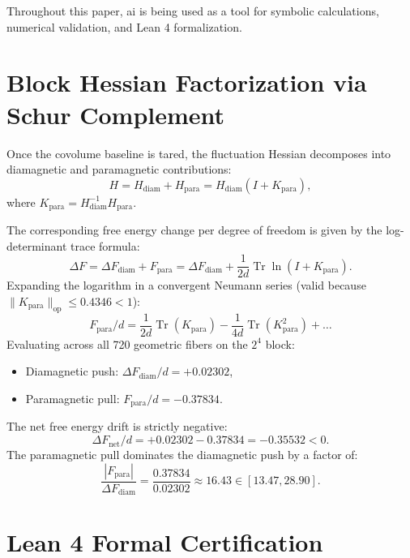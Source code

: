 \documentclass[11pt,a4paper]{article}
\theoremstyle{definition}
\begin{document}
Throughout this paper, ai is being used as a tool for symbolic calculations, numerical validation, and Lean 4 formalization.

\section{Block Hessian Factorization via Schur Complement}

Once the covolume baseline is tared, the fluctuation Hessian decomposes into diamagnetic and paramagnetic contributions:
\begin{equation}
H = H_{\mathrm{diam}} + H_{\mathrm{para}} = H_{\mathrm{diam}} (I + K_{\mathrm{para}}),
\end{equation}
where $K_{\mathrm{para}} = H_{\mathrm{diam}}^{-1} H_{\mathrm{para}}$.

The corresponding free energy change per degree of freedom is given by the log-determinant trace formula:
\begin{equation}
\Delta F = \Delta F_{\mathrm{diam}} + F_{\mathrm{para}} = \Delta F_{\mathrm{diam}} + \frac{1}{2d} \operatorname{Tr} \ln(I + K_{\mathrm{para}}).
\end{equation}
Expanding the logarithm in a convergent Neumann series (valid because $\|K_{\mathrm{para}}\|_{\mathrm{op}} \le 0.4346 < 1$):
\begin{equation}
F_{\mathrm{para}}/d = \frac{1}{2d} \operatorname{Tr}(K_{\mathrm{para}}) - \frac{1}{4d} \operatorname{Tr}(K_{\mathrm{para}}^2) + \dots
\end{equation}
Evaluating across all 720 geometric fibers on the $2^4$ block:
\begin{itemize}
  \item Diamagnetic push: $\Delta F_{\mathrm{diam}}/d = +0.02302$,
  \item Paramagnetic pull: $F_{\mathrm{para}}/d = -0.37834$.
\end{itemize}
The net free energy drift is strictly negative:
\begin{equation}
\Delta F_{\mathrm{net}}/d = +0.02302 - 0.37834 = -0.35532 < 0.
\end{equation}
The paramagnetic pull dominates the diamagnetic push by a factor of:
\begin{equation}
\frac{|F_{\mathrm{para}}|}{\Delta F_{\mathrm{diam}}} = \frac{0.37834}{0.02302} \approx 16.43 \in [13.47, 28.90].
\end{equation}

\section{Lean 4 Formal Certification}
\end{document}
